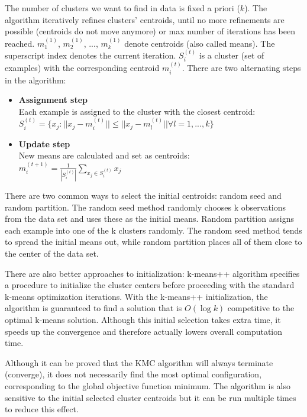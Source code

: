 \documentclass[conference]{IEEEtran}
\begin{document}
The number of clusters we want to find in data is fixed a priori ($k$).
The algorithm iteratively refines clusters' centroids,
until no more refinements are possible (centroids do not move anymore)
or max number of iterations has been reached. $m_1^{(1)}$, $m_2^{(1)}$, ..., $m_k^{(1)}$
denote centroids (also called means). The superscript index denotes the current iteration.
$S_i^{(t)}$ is a cluster (set of examples) with the corresponding centroid $m_i^{(t)}$.
There are two alternating steps in the algorithm:

\begin{itemize}
\item \textbf{Assignment step}\\
  Each example is assigned to the cluster with the closest centroid:\\
  $S_i^{(t)} = \{x_j : ||x_j - m_i^{(t)}|| \le ||x_j - m_l^{(t)}|| \forall l = 1, ..., k\}$
\\
\item \textbf{Update step}\\
  New means are calculated and set as centroids:\\
  $m_i^{(t+1)} = \frac{1}{|S_i^{(t)}|} \displaystyle\sum\limits_{x_j \in S_i^{(t)}}{x_j}$
\end{itemize}

There are two common ways to select the initial centroids: random seed and random partition.
The random seed method randomly chooses k observations from the data set
and uses these as the initial means. Random partition
assigns each example into one of the k clusters randomly.
The random seed method tends to spread the initial means out, while random partition
places all of them close to the center of the data set.

There are also better approaches to initialization: k-means++ algorithm specifies a
procedure to initialize the cluster centers before proceeding with the standard k-means
optimization iterations. With the k-means++ initialization, the algorithm is guaranteed
to find a solution that is $O(\log k)$ competitive to the optimal k-means solution.
Although this initial selection takes extra time, it speeds up the convergence and 
therefore actually lowers overall computation time.

Although it can be proved that the KMC algorithm will always terminate (converge),
it does not necessarily find the most optimal configuration,
corresponding to the global objective function minimum. The algorithm is also sensitive
to the initial selected cluster centroids but it can be run multiple times to reduce this effect.
\end{document}
